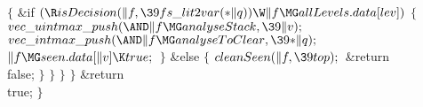 {{{{${}\{{}$\1\6
\&{if} ${}(\R\\{isDecision}(\|f,\39\\{fs\_lit2var}({*}\|q))\W\|f\MG%
\\{allLevels}.\\{data}[\\{lev}]){}$\5
${}\{{}$\1\6
${}\\{vec\_uintmax\_push}({\AND}\|f\MG\\{analyseStack},\39\|v);{}$\6
${}\\{vec\_intmax\_push}({\AND}\|f\MG\\{analyseToClear},\39{*}\|q);{}$\6
${}\|f\MG\\{seen}.\\{data}[\|v]\K\\{true};{}$\6
\4${}\}{}$\2\6
\&{else}\5
${}\{{}$\1\6
${}\\{cleanSeen}(\|f,\39\\{top});{}$\6
\&{return} \\{false};\6
\4${}\}{}$\2\6
\4${}\}{}$\2\6
\4${}\}{}$\C{}\2\6
\4${}\}{}$\2\6
\&{return} \\{true};\6
\4${}\}{}$\2\par
\fi

}}}}
